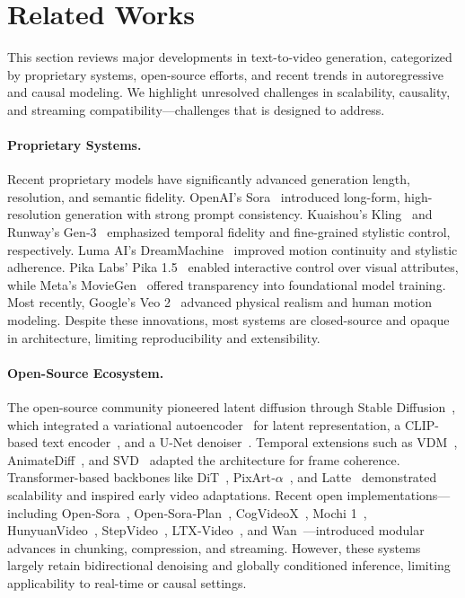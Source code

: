 \section{Related Works}

This section reviews major developments in text-to-video generation, categorized by proprietary systems, open-source efforts, and recent trends in autoregressive and causal modeling. We highlight unresolved challenges in scalability, causality, and streaming compatibility—challenges that \magi is designed to address.

\paragraph{Proprietary Systems.}
Recent proprietary models have significantly advanced generation length, resolution, and semantic fidelity. OpenAI’s Sora~\citep{openaisora2024} introduced long-form, high-resolution generation with strong prompt consistency. Kuaishou’s Kling~\citep{kuaishou2024kling} and Runway’s Gen‑3~\citep{runway2024gen3} emphasized temporal fidelity and fine-grained stylistic control, respectively. Luma AI’s DreamMachine~\citep{luma2024dm} improved motion continuity and stylistic adherence. Pika Labs’ Pika 1.5~\citep{pika2024pika} enabled interactive control over visual attributes, while Meta’s MovieGen~\citep{polyak2024moviegencastmedia} offered transparency into foundational model training. Most recently, Google's Veo 2~\citep{veo22025} advanced physical realism and human motion modeling. Despite these innovations, most systems are closed-source and opaque in architecture, limiting reproducibility and extensibility.

\paragraph{Open-Source Ecosystem.}
The open-source community pioneered latent diffusion through Stable Diffusion~\citep{esser2020taming}, which integrated a variational autoencoder~\citep{kingma2013auto} for latent representation, a CLIP-based text encoder~\citep{radford2021learning}, and a U-Net denoiser~\citep{ronneberger2015u}. Temporal extensions such as VDM~\citep{ho2022video}, AnimateDiff~\citep{guo2023animatediff}, and SVD~\citep{blattmann2023svd} adapted the architecture for frame coherence. Transformer-based backbones like DiT~\citep{dit}, PixArt‑$\alpha$~\citep{chen2023pixartalpha}, and Latte~\citep{ma2024latte} demonstrated scalability and inspired early video adaptations. Recent open implementations—including Open‑Sora~\citep{opensora}, Open‑Sora‑Plan~\citep{lin2024open}, CogVideoX~\citep{cogvideox}, Mochi 1~\citep{genmo2024mochi}, HunyuanVideo~\citep{kong2024hunyuanvideo}, StepVideo~\citep{ma2025step}, LTX‑Video~\citep{HaCohen2024LTXVideo}, and Wan~\citep{wang2025wan}—introduced modular advances in chunking, compression, and streaming. However, these systems largely retain bidirectional denoising and globally conditioned inference, limiting applicability to real-time or causal settings.

